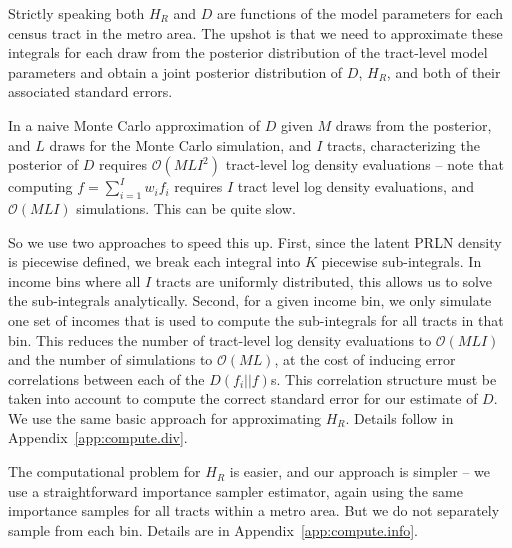 \documentclass[12pt]{article}
\begin{document}
Strictly speaking both $H_R$ and $D$ are functions of the model parameters for each census tract in the metro area. The upshot is that we need to approximate these integrals for each draw from the posterior distribution of the tract-level model parameters and obtain a joint posterior distribution of $D$, $H_R$, and both of their associated standard errors.

In a naive Monte Carlo approximation of $D$ given $M$ draws from the posterior, and $L$ draws for the Monte Carlo simulation, and $I$ tracts, characterizing the posterior of $D$ requires $\mathcal{O}(MLI^2)$ tract-level log density evaluations -- note that computing $f = \sum_{i=1}^Iw_if_i$ requires $I$ tract level log density evaluations, and $\mathcal{O}(MLI)$ simulations. This can be quite slow.

So we use two approaches to speed this up. First, since the latent PRLN density is piecewise defined, we break each integral into $K$ piecewise  sub-integrals. In income bins where all $I$ tracts are uniformly distributed, this allows us to solve the sub-integrals analytically. Second, for a given income bin, we only simulate one set of incomes that is used to compute the sub-integrals for all tracts in that bin. This reduces the number of tract-level log density evaluations to $\mathcal{O}(MLI)$ and the number of simulations to $\mathcal{O}(ML)$, at the cost of inducing error correlations between each of the $D(f_i||f)$s. This correlation structure must be taken into account to compute the correct standard error for our estimate of $D$. We use the same basic approach for approximating $H_R$. Details follow in Appendix~\ref{app:compute.div}.

The computational problem for $H_R$ is easier, and our approach is simpler -- we use a straightforward importance sampler estimator, again using the same importance samples for all tracts within a metro area. But we do not separately sample from each bin. Details are in Appendix~\ref{app:compute.info}.
\end{document}
